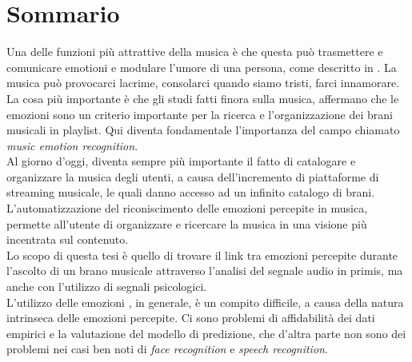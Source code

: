 \chapter{Sommario}
\label{Sommario}

\thispagestyle{empty}

\indent Una delle funzioni più attrattive della musica è che questa può trasmettere e comunicare emotioni e modulare l'umore di una persona, come descritto in \cite{feng2003popular}. La musica può provocarci lacrime, consolarci quando siamo tristi, farci innamorare.
\\
La cosa più importante è che gli studi fatti finora sulla musica, affermano che le emozioni sono un criterio importante per la ricerca e l'organizzazione dei brani musicali in playlist. Qui diventa fondamentale l'importanza del campo chiamato \textit{music emotion recognition}.
\\ \indent
Al giorno d'oggi, diventa sempre più importante il fatto di catalogare e organizzare la musica degli utenti, a causa dell'incremento di piattaforme di streaming musicale, le quali danno accesso ad un infinito catalogo di brani.
\\
L'automatizzazione del riconiscimento delle emozioni percepite in musica, permette all'utente di organizzare e ricercare la musica in una visione più incentrata sul contenuto.
\\ \indent
Lo scopo di questa tesi è quello di trovare il link tra emozioni percepite durante l'ascolto di un brano musicale attraverso l'analisi del segnale audio in primis, ma anche con l'utilizzo di segnali psicologici.
\\ \indent
L'utilizzo delle emozioni , in generale, è un compito difficile, a causa della natura intrinseca delle emozioni percepite. Ci sono problemi di affidabilità dei dati empirici e la valutazione del modello di predizione, che d'altra parte non sono dei problemi nei casi ben noti di \textit{face recognition} e \textit{speech recognition}.